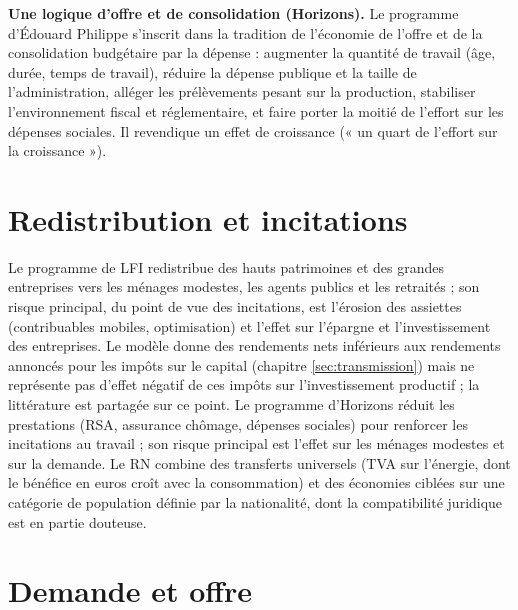 \documentclass[
  11pt,
  11pt,
  a4paper,
  openany]{book}
\begin{document}
\textbf{Une logique d'offre et de consolidation (Horizons).} Le
programme d'Édouard Philippe s'inscrit dans la tradition de l'économie
de l'offre et de la consolidation budgétaire par la dépense : augmenter
la quantité de travail (âge, durée, temps de travail), réduire la
dépense publique et la taille de l'administration, alléger les
prélèvements pesant sur la production, stabiliser l'environnement fiscal
et réglementaire, et faire porter la moitié de l'effort sur les dépenses
sociales. Il revendique un effet de croissance (« un quart de l'effort
sur la croissance »).

\hypertarget{sec:redistribution-incitations}{%
\section{Redistribution et
incitations}\label{sec:redistribution-incitations}}

Le programme de LFI redistribue des hauts patrimoines et des grandes
entreprises vers les ménages modestes, les agents publics et les
retraités ; son risque principal, du point de vue des incitations, est
l'érosion des assiettes (contribuables mobiles, optimisation) et l'effet
sur l'épargne et l'investissement des entreprises. Le modèle donne des
rendements nets inférieurs aux rendements annoncés pour les impôts sur
le capital (chapitre \ref{sec:transmission}) mais ne représente pas
d'effet négatif de ces impôts sur l'investissement productif ; la
littérature est partagée sur ce point. Le programme d'Horizons réduit
les prestations (RSA, assurance chômage, dépenses sociales) pour
renforcer les incitations au travail ; son risque principal est l'effet
sur les ménages modestes et sur la demande. Le RN combine des transferts
universels (TVA sur l'énergie, dont le bénéfice en euros croît avec la
consommation) et des économies ciblées sur une catégorie de population
définie par la nationalité, dont la compatibilité juridique est en
partie douteuse.

\hypertarget{sec:demande-offre}{%
\section{Demande et offre}\label{sec:demande-offre}}
\end{document}
